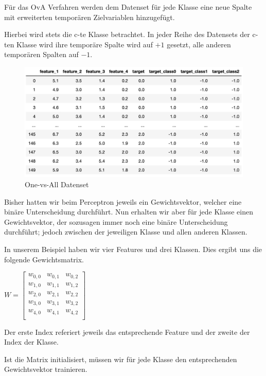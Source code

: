 Für das OvA Verfahren werden dem Datenset für jede Klasse eine neue Spalte mit erweiterten temporären Zielvariablen hinzugefügt.

Hierbei wird stets die c-te Klasse betrachtet. In jeder Reihe des Datensets der c-ten Klasse wird ihre temporäre Spalte wird auf $+1$ gesetzt, alle anderen temporären Spalten auf $-1$. 

\begin{figure}[H]
	\centering
	\label{fig:one_vs_all_ds}
	\includegraphics[scale=0.5]{figures/OvA_datenset}
	\caption{One-vs-All Datenset}
\end{figure}


Bisher hatten wir beim Perceptron jeweils ein Gewichtsvektor, welcher eine binäre Unterscheidung durchführt. Nun erhalten wir aber für jede Klasse einen Gewichtsvektor, der sozusagen immer noch eine binäre Unterscheidung durchführt; jedoch zwischen der jeweiligen Klasse und allen anderen Klassen.

In unserem Beispiel haben wir vier Features und drei Klassen. Dies ergibt uns die folgende Gewichtsmatrix.

$W = \begin{bmatrix}
w_{0,0} & w_{0,1} & w_{0,2}\\
w_{1,0} & w_{1,1} & w_{1,2}\\
w_{2,0} & w_{2,1} & w_{2,2}\\
w_{3,0} & w_{3,1} & w_{3,2}\\
w_{4,0} & w_{4,1} & w_{4,2}\\
\end{bmatrix}$


Der erste Index referiert jeweils das entsprechende Feature und der zweite der Index der Klasse.

Ist die Matrix initialisiert, müssen wir für jede Klasse den entsprechenden Gewichtsvektor trainieren. 


